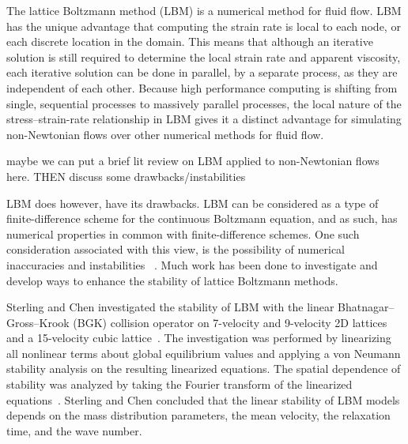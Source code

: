 \documentclass{article}
\begin{document}
The lattice Boltzmann method (LBM) is a numerical method for fluid flow.
LBM has the unique advantage that computing the strain rate is local to each node, or each discrete location in the domain.
This means that although an iterative solution is still required to determine the local strain rate and apparent viscosity, each iterative solution can be done in parallel, by a separate process, as they are independent of each other.
Because high performance computing is shifting from single, sequential processes to massively parallel processes, the local nature of the stress--strain-rate relationship in LBM gives it a distinct advantage for simulating non-Newtonian flows over other numerical methods for fluid flow. %

{\color{red} maybe we can put a brief lit review on LBM applied to non-Newtonian flows here. THEN discuss some drawbacks/instabilities}

LBM does however, have its drawbacks.
LBM can be considered as a type of finite-difference scheme for the continuous Boltzmann equation, and as such, has numerical properties in common with finite-difference schemes. %
One such consideration associated with this view, is the possibility of numerical inaccuracies and instabilities ~\cite{sterling1993stability,sterling1996stability,bawazeer2013stability,lallemand2000theory}. %
Much work has been done to investigate and develop ways to enhance the stability of lattice Boltzmann methods.

Sterling and Chen investigated the stability of LBM with the linear Bhatnagar--Gross--Krook (BGK) collision operator on 7-velocity and 9-velocity 2D lattices and a 15-velocity cubic lattice~\cite{sterling1993stability,sterling1996stability}.
The investigation was performed by linearizing all nonlinear terms about global equilibrium values and applying a von Neumann stability analysis on the resulting linearized equations.
The spatial dependence of stability was analyzed by taking the Fourier transform of the linearized equations~\cite{sterling1993stability}.
Sterling and Chen concluded that the linear stability of LBM models depends on the mass distribution parameters, the mean velocity, the relaxation time, and the wave number. %
\end{document}
